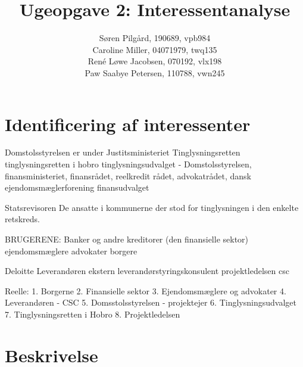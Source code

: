 \documentclass[10pt,a4paper,danish]{article}
\title{Ugeopgave 2: Interessentanalyse}
\author{Søren Pilgård, 190689, vpb984\\
Caroline Miller, 04071979, twq135\\
René Løwe Jacobsen, 070192, vlx198\\
Paw Saabye Petersen, 110788, vwn245}
\begin{document}
\maketitle
\newpage


\section{Identificering af interessenter}
Domstolsstyrelsen er under
Justitsministeriet
Tinglysningsretten
tinglysningsretten i hobro
tinglysningsudvalget - Domstolsstyrelsen, finansministeriet, finansrådet, reelkredit rådet, advokatrådet, dansk ejendomsmæglerforening
finansudvalget

Statsrevisoren
De ansatte i kommunerne der stod for tinglysningen i den enkelte retskreds.

BRUGERENE:
Banker og andre kreditorer (den finansielle sektor)
ejendomsmæglere
advokater
borgere

Deloitte
Leverandøren
ekstern leverandørstyringskonsulent
projektledelsen
csc


Reelle:
1. Borgerne
2. Finansielle sektor
3. Ejendomsmæglere og advokater
4. Leverandøren - CSC
5. Domsstolsstyrelsen - projektejer
6. Tinglysningsudvalget
7. Tinglysningsretten i Hobro
8. Projektledelsen


\section{Beskrivelse}
\end{document}

